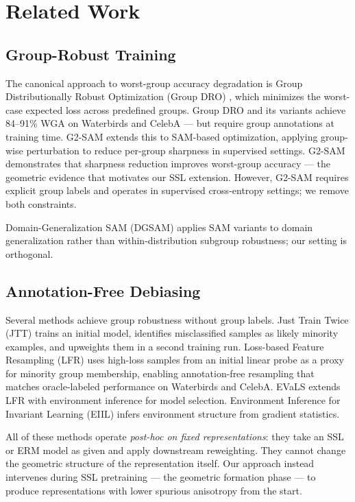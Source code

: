 \section{Related Work}
\label{sec:related}

\subsection{Group-Robust Training}

The canonical approach to worst-group accuracy degradation is Group Distributionally Robust Optimization (Group DRO) \citep{sagawa2019dro}, which minimizes the worst-case expected loss across predefined groups. Group DRO and its variants achieve 84--91\% WGA on Waterbirds and CelebA --- but require group annotations at training time. G2-SAM \citep{park2025g2sam} extends this to SAM-based optimization, applying group-wise perturbation to reduce per-group sharpness in supervised settings. G2-SAM demonstrates that sharpness reduction improves worst-group accuracy --- the geometric evidence that motivates our SSL extension. However, G2-SAM requires explicit group labels and operates in supervised cross-entropy settings; we remove both constraints.

Domain-Generalization SAM (DGSAM) \citep{song2025dgsam} applies SAM variants to domain generalization rather than within-distribution subgroup robustness; our setting is orthogonal.

\subsection{Annotation-Free Debiasing}

Several methods achieve group robustness without group labels. Just Train Twice (JTT) \citep{liu2021jtt} trains an initial model, identifies misclassified samples as likely minority examples, and upweights them in a second training run. Loss-based Feature Resampling (LFR) \citep{ghaznavi2023lfr} uses high-loss samples from an initial linear probe as a proxy for minority group membership, enabling annotation-free resampling that matches oracle-labeled performance on Waterbirds and CelebA. EVaLS \citep{ghaznavi2024evals} extends LFR with environment inference for model selection. Environment Inference for Invariant Learning (EIIL) \citep{creager2021eiil} infers environment structure from gradient statistics.

All of these methods operate \textit{post-hoc on fixed representations}: they take an SSL or ERM model as given and apply downstream reweighting. They cannot change the geometric structure of the representation itself. Our approach instead intervenes during SSL pretraining --- the geometric formation phase --- to produce representations with lower spurious anisotropy from the start.

